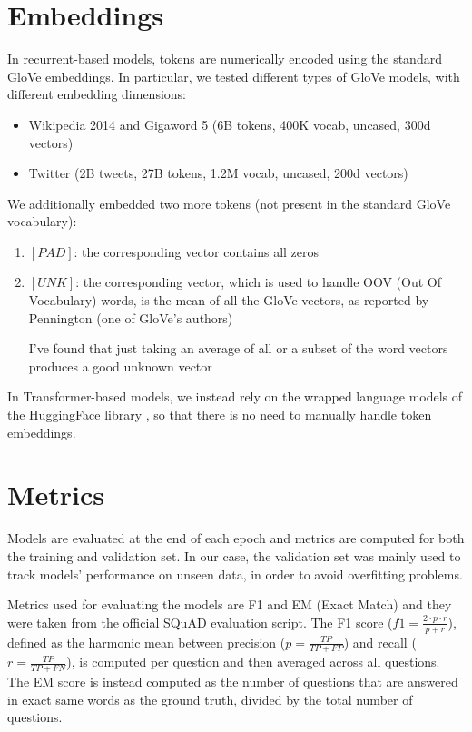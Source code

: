 \documentclass[a4paper,10pt]{report}
\begin{document}
\section{Embeddings}\label{sec:embeddings}
In recurrent-based models, tokens are numerically encoded using the standard GloVe embeddings. In particular, we tested different types of GloVe models, with different embedding dimensions:
\begin{itemize}
  \item Wikipedia 2014 and Gigaword 5 (6B tokens, 400K vocab, uncased, 300d vectors)
  \item Twitter (2B tweets, 27B tokens, 1.2M vocab, uncased, 200d vectors)
\end{itemize}

We additionally embedded two more tokens (not present in the standard GloVe vocabulary):
\begin{enumerate}
  \item $[PAD]$: the corresponding vector contains all zeros
  \item $[UNK]$: the corresponding vector, which is used to handle OOV (Out Of Vocabulary) words, is the mean of all the GloVe vectors, as reported by Pennington (one of GloVe's authors)
        \begin{displayquote}I've found that just taking an average of all or a subset of the word vectors produces a good unknown vector \end{displayquote}
\end{enumerate}

In Transformer-based models, we instead rely on the wrapped language models of the HuggingFace library \cite{hugginface}, so that there is no need to manually handle token embeddings.

\section{Metrics}
Models are evaluated at the end of each epoch and metrics are computed for both the training and validation set. In our case, the validation set was mainly used to track models' performance on unseen data, in order to avoid overfitting problems.

Metrics used for evaluating the models are F1 and EM (Exact Match) and they were taken from the official SQuAD evaluation script. The F1 score ($f1=\frac{2\cdot p \cdot r}{p+r}$), defined as the harmonic mean between precision ($p=\frac{TP}{TP+FP}$) and recall ($r=\frac{TP}{TP+FN}$), is computed per question and then averaged across all questions. The EM score is instead computed as the number of questions that are answered in exact same words as the ground truth, divided by the total number of questions.
\end{document}
